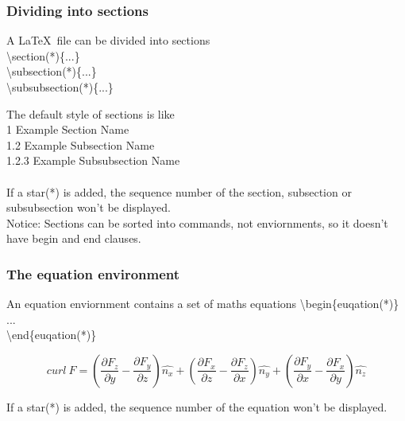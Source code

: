 \documentclass{beamer}
\begin{document}
\begin{frame}
	\frametitle{Dividing into sections}
	\begin{definition}
	A \LaTeX\ file can be divided into sections\\
	{\color{red}\textbackslash section(*)\{...\}}\\
	{\color{red}\textbackslash subsection(*)\{...\}}\\
	{\color{red}\textbackslash subsubsection(*)\{...\}}\\
	\end{definition}
	The default style of sections is like\\
	{\color{blue}1 Example Section Name}\\
	{\color{blue}1.2 Example Subsection Name}\\
	{\color{blue}1.2.3 Example Subsubsection Name}\\
	\ \\
	If a star({\color{blue}*}) is added, the sequence number of the section, subsection or subsubsection won't be displayed.\\
	{\color{blue}Notice:} Sections can be sorted into commands, not enviornments, so it doesn't have {\color{blue}begin} and {\color{blue}end} clauses.
\end{frame}

\begin{frame}

\end{frame}

\begin{frame}
	\frametitle{The equation environment}
	\begin{definition}
		An {\color{blue}equation} enviornment contains a set of maths equations
		{\color{red}\textbackslash begin\{euqation(*)\}}\\
		\quad ...\\
		{\color{red}\textbackslash end\{euqation(*)\}}\\
	\end{definition}
	\begin{example}
		\begin{equation}
		curl\ F=\left(\frac{\partial F_z}{\partial y}-\frac{\partial F_y}{\partial z}\right)\hat{n_x}+\left(\frac{\partial F_x}{\partial z}-\frac{\partial F_z}{\partial x}\right)\hat{n_y}+\left(\frac{\partial F_y}{\partial x}-\frac{\partial F_x}{\partial y}\right)\hat{n_z}
		\end{equation}
	\end{example}
	If a star({\color{blue}*}) is added, the sequence number of the equation won't be displayed.
\end{frame}
\end{document}
